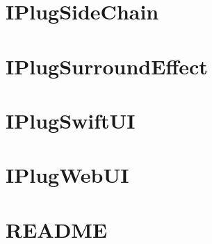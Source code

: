 \let\mypdfximage\pdfximage\def\pdfximage{\immediate\mypdfximage}\documentclass[twoside]{book}
\newcommand{\+}{\discretionary{\mbox{\scriptsize$\hookleftarrow$}}{}{}}
\begin{document}
\chapter{I\+Plug\+Side\+Chain}
\label{md__c_1__users_fab_src__github_branches__neural_amp_modeler_plugin_i_plug2__examples__i_plug_side_chain__r_e_a_d_m_e}

\chapter{I\+Plug\+Surround\+Effect}
\label{md__c_1__users_fab_src__github_branches__neural_amp_modeler_plugin_i_plug2__examples__i_plug_surround_effect__r_e_a_d_m_e}

\chapter{I\+Plug\+Swift\+UI}
\label{md__c_1__users_fab_src__github_branches__neural_amp_modeler_plugin_i_plug2__examples__i_plug_swift_u_i__r_e_a_d_m_e}

\chapter{I\+Plug\+Web\+UI}
\label{md__c_1__users_fab_src__github_branches__neural_amp_modeler_plugin_i_plug2__examples__i_plug_web_u_i__r_e_a_d_m_e}

\chapter{R\+E\+A\+D\+ME}
\label{md__c_1__users_fab_src__github_branches__neural_amp_modeler_plugin_i_plug2__examples__r_e_a_d_m_e}

\end{document}
